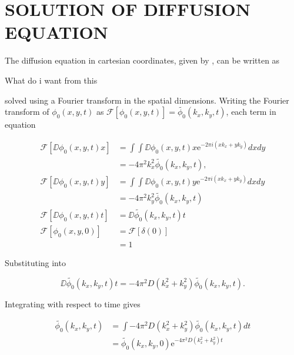 

\section{SOLUTION OF DIFFUSION EQUATION}

The diffusion equation in cartesian coordinates, given by , can be written as

{\huge What do i want from this}

 solved using a Fourier transform in the spatial dimensions. Writing the Fourier transform of $\phi_0(x,y,t)$ as $\mathscr{F}\left[ \phi_0(x,y,t) \right] = \tilde{\phi_0}(k_x,k_y,t)$, each term in equation

\begin{equation}
\begin{split}
  \mathscr{F}\left[ \DD{\phi_0(x,y,t)}{x} \right] &= \int \int \DD{\phi_0(x,y,t)}{x} \mathrm{e}^{-2\pi i(xk_x + yk_y)} dx dy \\
  &= -4\pi^2k_x^2 \tilde{\phi_0}(k_x,k_y,t), \\
  \mathscr{F}\left[ \DD{\phi_0(x,y,t)}{y} \right] &= \int \int \DD{\phi_0(x,y,t)}{y} \mathrm{e}^{-2\pi i(xk_x + yk_y)} dx dy \\
  &= -4\pi^2k_y^2 \tilde{\phi_0}(k_x,k_y,t) \\
  \mathscr{F}\left[\DD{\phi_0(x,y,t)}{t}\right] &= \DD{\tilde{\phi_0}(k_x,k_y,t)}{t} \\
  \mathscr{F}\left[\phi_0(x,y,0)\right] &= \mathscr{F}\left[\delta(0)\right] \\
  &= 1
\end{split}
\end{equation}


Substituting into 

\begin{equation}
  \DD{\tilde{\phi_0}(k_x,k_y,t)}{t} = -4\pi^2D (k_x^2 + k_y^2) \tilde{\phi_0}(k_x,k_y,t).
\end{equation}

Integrating with respect to time gives

\begin{equation}
\begin{split}
  \tilde{\phi_0}(k_x,k_y,t) &= \int -4\pi^2D (k_x^2 + k_y^2) \tilde{\phi_0}(k_x,k_y,t) dt \\
  &= \tilde{\phi_0}(k_x,k_y,0)\mathrm{e}^{-4\pi^2D(k_x^2 + k_y^2)t} \\
\end{split}
\end{equation}

